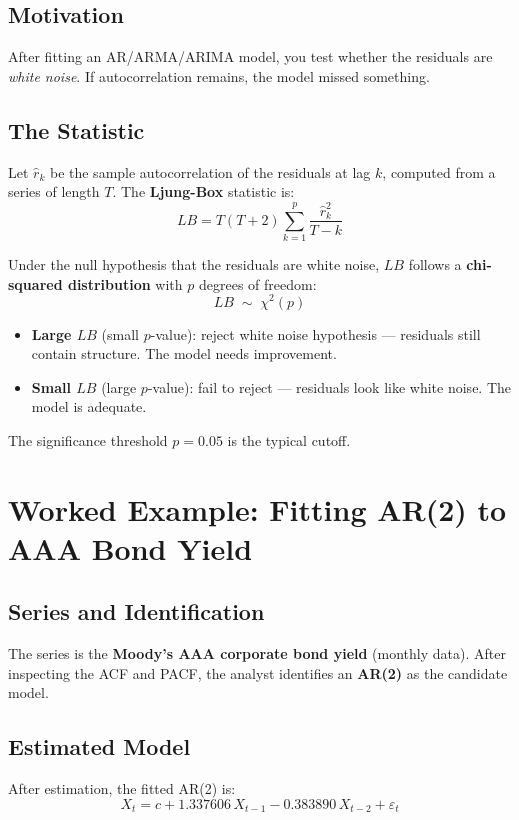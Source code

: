 \documentclass[11pt]{article}
\begin{document}
\subsection{Motivation}
After fitting an AR/ARMA/ARIMA model, you test whether the residuals are
\emph{white noise}. If autocorrelation remains, the model missed something.

\subsection{The Statistic}
Let $\hat{r}_k$ be the sample autocorrelation of the residuals at lag $k$,
computed from a series of length $T$. The \textbf{Ljung-Box} statistic is:
\[
LB = T(T+2) \sum_{k=1}^{p} \frac{\hat{r}_k^2}{T - k}
\]

Under the null hypothesis that the residuals are white noise, $LB$ follows a
\textbf{chi-squared distribution} with $p$ degrees of freedom:
\[
LB \;\sim\; \chi^2(p)
\]

\begin{itemize}
    \item \textbf{Large $LB$} (small $p$-value): reject white noise hypothesis
      --- residuals still contain structure. The model needs improvement.
    \item \textbf{Small $LB$} (large $p$-value): fail to reject --- residuals
      look like white noise. The model is adequate.
\end{itemize}

The significance threshold $p = 0.05$ is the typical cutoff.


\section{Worked Example: Fitting AR(2) to AAA Bond Yield}

\subsection{Series and Identification}
The series is the \textbf{Moody's AAA corporate bond yield} (monthly data).
After inspecting the ACF and PACF, the analyst identifies an \textbf{AR(2)}
as the candidate model.

\subsection{Estimated Model}
After estimation, the fitted AR(2) is:
\[
X_t = c + 1.337606\, X_{t-1} - 0.383890\, X_{t-2} + \varepsilon_t
\]
\end{document}
